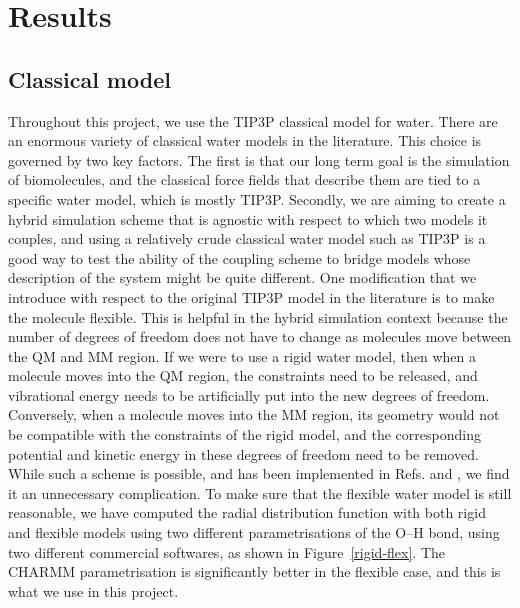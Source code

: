 \documentclass[11pt]{revtex4}
\begin{document}

\section{Results}

\subsection{Classical model}

Throughout this project, we use the TIP3P classical model for water. There are an enormous variety of classical water models in the literature. This choice is governed by two key factors. The first is that our long term goal is the simulation of biomolecules, and the classical force fields that describe them are tied to a specific water model, which is mostly TIP3P. Secondly, we are aiming to create a hybrid simulation scheme that is agnostic with respect to which two models it couples, and using a relatively crude classical water model such as TIP3P is a good way to test the ability of the coupling scheme to bridge models whose description of the system might be quite different. One modification that we introduce with respect to the original TIP3P model in the literature is to make the molecule flexible. This is helpful in the hybrid simulation context because the number of degrees of freedom does not have to change as molecules move between the QM and MM region. If we were to use a rigid water model, then when a molecule moves into the QM region, the constraints need to be released, and vibrational energy needs to be artificially put into the new degrees of freedom. Conversely, when a molecule moves into the MM region, its geometry would not be compatible with the constraints of the rigid model, and the corresponding potential and kinetic energy in these degrees of freedom need to be removed. While such a scheme is possible, and has been implemented in Refs. and , we find it an unnecessary complication. To make sure that the flexible water model is still reasonable, we have computed the radial distribution function with both rigid and flexible models using two different parametrisations of the O--H bond, using two different commercial softwares, as shown in Figure~\ref{rigid-flex}. The CHARMM parametrisation is significantly better in the flexible case, and this is what we use in this project.
\end{document}
